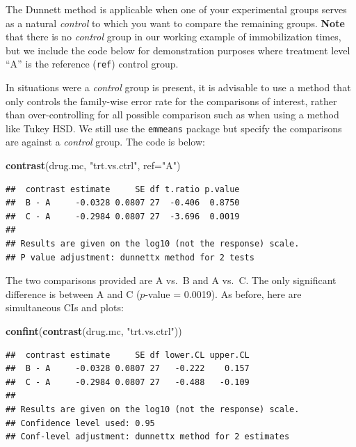 \documentclass[
]{book}
\newenvironment{Shaded}{\begin{snugshade}}{\end{snugshade}}
\newcommand{\AttributeTok}[1]{\textcolor[rgb]{0.13,0.29,0.53}{#1}}
\newcommand{\FunctionTok}[1]{\textcolor[rgb]{0.13,0.29,0.53}{\textbf{#1}}}
\newcommand{\NormalTok}[1]{#1}
\newcommand{\StringTok}[1]{\textcolor[rgb]{0.31,0.60,0.02}{#1}}
\begin{document}
The Dunnett method is applicable when one of your experimental groups serves as a natural \emph{control} to which you want to compare the remaining groups.
\textbf{Note} that there is no \emph{control} group in our working example of immobilization times, but we include the code below for demonstration purposes where treatment level ``A'' is the reference (\texttt{ref}) control group.

In situations were a \emph{control} group is present, it is advisable to use a method that only controls the family-wise error rate for the comparisons of interest, rather than over-controlling for all possible comparison such as when using a method like Tukey HSD.
We still use the \texttt{emmeans} package but specify the comparisons are against a \emph{control} group. The code is below:

\begin{Shaded}
\begin{Highlighting}[]
\FunctionTok{contrast}\NormalTok{(drug.mc, }\StringTok{"trt.vs.ctrl"}\NormalTok{, }\AttributeTok{ref=}\StringTok{"A"}\NormalTok{)}
\end{Highlighting}
\end{Shaded}

\begin{verbatim}
##  contrast estimate     SE df t.ratio p.value
##  B - A     -0.0328 0.0807 27  -0.406  0.8750
##  C - A     -0.2984 0.0807 27  -3.696  0.0019
## 
## Results are given on the log10 (not the response) scale. 
## P value adjustment: dunnettx method for 2 tests
\end{verbatim}

The two comparisons provided are A vs.~B and A vs.~C.
The only significant difference is between A and C (\(p\)-value = 0.0019).
As before, here are simultaneous CIs and plots:

\begin{Shaded}
\begin{Highlighting}[]
\FunctionTok{confint}\NormalTok{(}\FunctionTok{contrast}\NormalTok{(drug.mc, }\StringTok{"trt.vs.ctrl"}\NormalTok{))}
\end{Highlighting}
\end{Shaded}

\begin{verbatim}
##  contrast estimate     SE df lower.CL upper.CL
##  B - A     -0.0328 0.0807 27   -0.222    0.157
##  C - A     -0.2984 0.0807 27   -0.488   -0.109
## 
## Results are given on the log10 (not the response) scale. 
## Confidence level used: 0.95 
## Conf-level adjustment: dunnettx method for 2 estimates
\end{verbatim}
\end{document}
